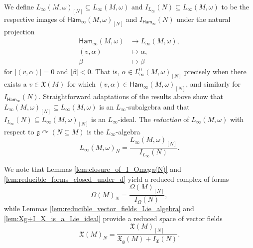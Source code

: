 \documentclass[pdftex]{sigma}
\numberwithin{equation}{section}
\newcommand{\g}{\mathfrak{g}}
\newcommand{\Ham}{\mathsf{Ham}}
\newcommand{\X}{\mathfrak{X}}
\renewcommand{\subset}{\subseteq}
\begin{document}
\begin{Definition}\label{def:associatedLinftyReductions}
	We define $L_\infty(M,\omega)_{[N]}\subset L_\infty(M,\omega)$ and $I_{L_\infty}(N)\subset L_\infty(M,\omega)$ to be the respective images of $\Ham_\infty(M,\omega)_{[N]}$ and $I_{\Ham_\infty}(N)$ under the natural projection
	\begin{align*}
		\Ham_\infty(M,\omega)	&\to		L_\infty(M,\omega),	\\
		(v,\alpha)		&\mapsto	\alpha,		\\
		\beta		&\mapsto	\beta
	\end{align*}
	for $|(v,\alpha)|=0$ and $|\beta|<0$. That is, $\alpha\in L_\infty^0(M,\omega)_{[N]}$ precisely when there exists a $v\in\X(M)$ for which $(v,\alpha)\in\Ham_\infty(M,\omega)_{[N]}$, and similarly for $I_{\Ham_\infty}(N)$. Straightforward adaptations of the results above show that $L_\infty(M,\omega)_{[N]}\subset L_\infty(M,\omega)$ is an $L_\infty$-subalgebra and that $I_{L_\infty}(N)\subset L_\infty(M,\omega)_{[N]}$ is an $L_\infty$-ideal. The \emph{reduction} of $L_\infty(M,\omega)$ with respect to $\g\curvearrowright (N\subset M)$ is the $L_\infty$-algebra
	\[
		L_\infty(M,\omega)_N = \frac{L_\infty(M,\omega)_{[N]}}{I_{L_\infty}(N)}.
	\]
\end{Definition}

\begin{Remark}\label{rem:reduced_spaces_of_vfs_and_forms}
	We note that Lemmas \ref{lem:closure_of_I_Omega(N)} and \ref{lem:reducible_forms_closed_under_d} yield a reduced complex of forms
	\[
		\Omega(M)_N = \frac{\Omega(M)_{[N]}}{I_\Omega(N)},
	\]
	while Lemmas \ref{lem:reducible_vector_fields_Lie_algebra} and \ref{lem:Xg+I_X_is_a_Lie_ideal} provide a reduced space of vector fields
	\[
		\X(M)_N = \frac{\X(M)_{[N]}}{\X_\g(M)+I_\X(N)}.
	\]
\end{Remark}
\end{document}
